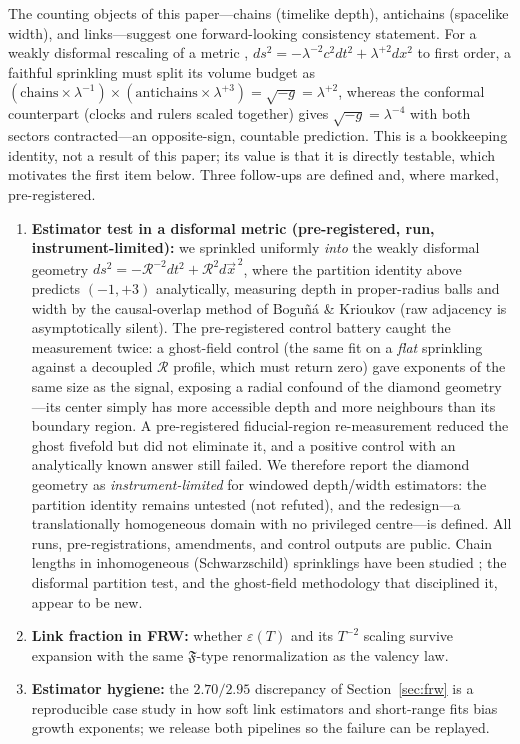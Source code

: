 \documentclass[11pt,a4paper]{article}
\begin{document}
The counting objects of this paper---chains (timelike depth), antichains
(spacelike width), and links---suggest one forward-looking consistency
statement. For a weakly disformal rescaling of a metric
\cite{Bekenstein1993}, $ds^{2} = -\lambda^{-2}c^{2}dt^{2} + \lambda^{+2}dx^{2}$
to first order, a faithful sprinkling must split its volume budget as
$(\text{chains} \times \lambda^{-1}) \times (\text{antichains} \times
\lambda^{+3}) = \sqrt{-g} = \lambda^{+2}$, whereas the conformal counterpart
(clocks and rulers scaled together) gives $\sqrt{-g} = \lambda^{-4}$ with both
sectors contracted---an opposite-sign, countable prediction. This is a
bookkeeping identity, not a result of this paper; its value is that it is
directly testable, which motivates the first item below. Three follow-ups are
defined and, where marked, pre-registered.

\begin{enumerate}
\item \textbf{Estimator test in a disformal metric (pre-registered, run,
  instrument-limited):} we sprinkled uniformly \emph{into} the weakly
  disformal geometry
  $ds^{2} = -\mathcal{R}^{-2}dt^{2} + \mathcal{R}^{2}d\vec{x}^{\,2}$, where
  the partition identity above predicts $(-1,+3)$ analytically, measuring
  depth in proper-radius balls and width by the causal-overlap method of
  Bogu\~n\'a \& Krioukov \cite{BogunaKrioukov2024} (raw adjacency is
  asymptotically silent). The pre-registered control battery caught the
  measurement twice: a ghost-field control (the same fit on a \emph{flat}
  sprinkling against a decoupled $\mathcal{R}$ profile, which must return
  zero) gave exponents of the same size as the signal, exposing a
  radial confound of the diamond geometry---its center simply has more
  accessible depth and more neighbours than its boundary region. A
  pre-registered fiducial-region re-measurement reduced the ghost fivefold
  but did not eliminate it, and a positive control with an analytically
  known answer still failed. We therefore report the diamond geometry as
  \emph{instrument-limited} for windowed depth/width estimators: the
  partition identity remains untested (not refuted), and the redesign---a
  translationally homogeneous domain with no privileged centre---is
  defined. All runs, pre-registrations, amendments, and control outputs
  are public. Chain lengths in inhomogeneous (Schwarzschild) sprinklings
  have been studied \cite{Eichhorn2026}; the disformal partition test, and
  the ghost-field methodology that disciplined it, appear to be new.
\item \textbf{Link fraction in FRW:} whether $\varepsilon(T)$ and its $T^{-2}$
  scaling survive expansion with the same $\mathfrak{F}$-type renormalization
  as the valency law.
\item \textbf{Estimator hygiene:} the $2.70/2.95$ discrepancy of
  Section~\ref{sec:frw} is a reproducible case study in how soft link
  estimators and short-range fits bias growth exponents; we release both
  pipelines so the failure can be replayed.
\end{enumerate}
\end{document}
